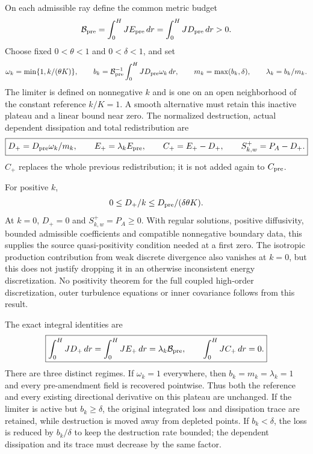 \documentclass[11pt,a4paper]{article}
\numberwithin{equation}{section}
\begin{document}
On each admissible ray define the common metric budget
\begin{equation}
 \mathcal B_{\rm pre}=\int_0^HJE_{\rm pre}\,dr
 =\int_0^HJD_{\rm pre}\,dr>0.
 \label{eq:wj-wall-common-budget}
\end{equation}
Choose fixed $0<\theta<1$ and $0<\delta<1$, and set
\begin{equation}
 \omega_k=\min\{1,k/(\theta K)\},\qquad
 b_k=\mathcal B_{\rm pre}^{-1}\int_0^HJD_{\rm pre}\omega_k\,dr,
 \qquad m_k=\max(b_k,\delta),\qquad \lambda_k=b_k/m_k.
 \label{eq:wj-wall-positive-weights}
\end{equation}
The limiter is defined on nonnegative $k$ and is one on an open
neighborhood of the constant reference $k/K=1$. A smooth alternative
must retain this inactive plateau and a linear bound near zero.
The normalized destruction, actual dependent dissipation and total
redistribution are
\begin{equation}
 \boxed{D_+=D_{\rm pre}\omega_k/m_k,\qquad
 E_+=\lambda_kE_{\rm pre},\qquad
 C_+=E_+-D_+,\qquad S_{k,w}^+=P_A-D_+.}
 \label{eq:wj-wall-positive-profiles}
\end{equation}
$C_+$ replaces the whole previous redistribution; it is not added
again to $C_{\rm pre}$.

For positive $k$,
\begin{equation}
 0\leq D_+/k\leq D_{\rm pre}/(\delta\theta K).
 \label{eq:wj-wall-positive-rate}
\end{equation}
At $k=0$, $D_+=0$ and $S_{k,w}^+=P_A\geq0$. With regular solutions,
positive diffusivity, bounded admissible coefficients and compatible
nonnegative boundary data, this supplies the source quasi-positivity
condition needed at a first zero. The isotropic production contribution
from weak discrete divergence also vanishes at $k=0$, but this does not
justify dropping it in an otherwise inconsistent energy discretization.
No positivity theorem for the full coupled high-order discretization,
outer turbulence equations or inner covariance follows from this result.

The exact integral identities are
\begin{equation}
 \boxed{\int_0^HJD_+\,dr=\int_0^HJE_+\,dr
 =\lambda_k\mathcal B_{\rm pre},\qquad
 \int_0^HJC_+\,dr=0.}
 \label{eq:wj-wall-positive-budget}
\end{equation}
There are three distinct regimes. If $\omega_k=1$ everywhere, then
$b_k=m_k=\lambda_k=1$ and every pre-amendment field is recovered
pointwise. Thus both the reference and every existing directional
derivative on this plateau are unchanged. If the limiter is active but
$b_k\geq\delta$, the original integrated loss and dissipation trace
are retained, while destruction is moved away from depleted points.
If $b_k<\delta$, the loss is reduced by $b_k/\delta$ to keep the
destruction rate bounded; the dependent dissipation and its trace
must decrease by the same factor.
\end{document}
